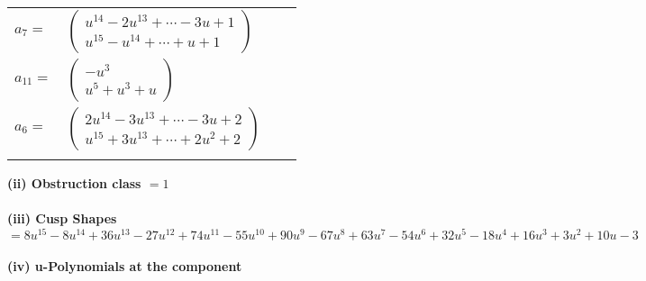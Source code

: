 \documentclass[1p]{elsarticle_modified}
\theoremstyle{definition}
\begin{document}
\begin{tabular}{m{7pt} m{180pt} m{7pt} m{180pt} }
\flushright $a_{7}=$&$\begin{pmatrix}u^{14}-2 u^{13}+\cdots-3 u+1\\u^{15}- u^{14}+\cdots+u+1\end{pmatrix}$ \\
\flushright $a_{11}=$&$\begin{pmatrix}- u^3\\u^5+u^3+u\end{pmatrix}$ \\
\flushright $a_{6}=$&$\begin{pmatrix}2 u^{14}-3 u^{13}+\cdots-3 u+2\\u^{15}+3 u^{13}+\cdots+2 u^2+2\end{pmatrix}$\\&\end{tabular}
\flushleft \textbf{(ii) Obstruction class $= 1$}\\~\\
\flushleft \textbf{(iii) Cusp Shapes $= 8 u^{15}-8 u^{14}+36 u^{13}-27 u^{12}+74 u^{11}-55 u^{10}+90 u^9-67 u^8+63 u^7-54 u^6+32 u^5-18 u^4+16 u^3+3 u^2+10 u-3$}\\~\\
\newpage\renewcommand{\arraystretch}{1}
\flushleft \textbf{(iv) u-Polynomials at the component}\newline \\
\end{document}

